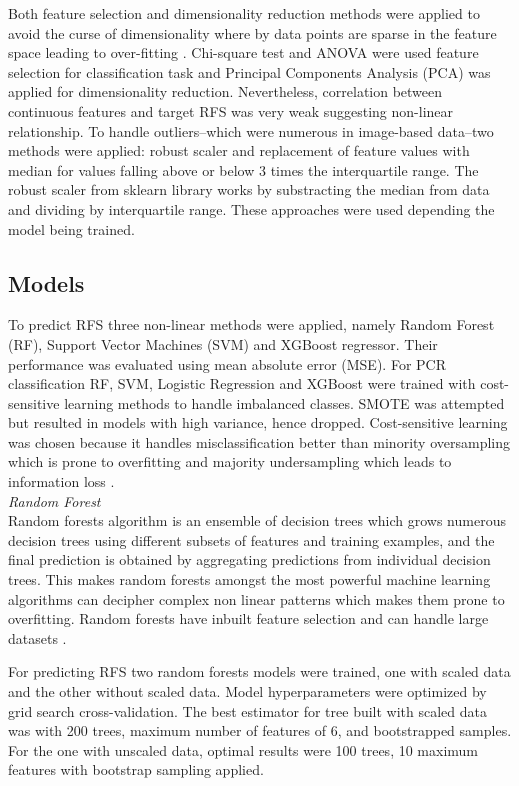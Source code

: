 \documentclass{article}
\begin{document}
Both feature selection and dimensionality reduction methods were applied to avoid the curse of dimensionality where by data points are sparse in the feature space leading to over-fitting \cite{geron2022hands}. Chi-square test and ANOVA were used feature selection for classification task and Principal Components Analysis (PCA) was applied for dimensionality reduction. Nevertheless, correlation between continuous features and target RFS was very weak suggesting non-linear relationship. 
To handle outliers--which were numerous in image-based data--two methods were applied: robust scaler and replacement of feature values with median for values falling above or below 3 times the interquartile range. The robust scaler from sklearn library works by substracting the median from data and dividing by interquartile range. These approaches were used depending the model being trained. 

\subsection{Models}
To predict RFS three non-linear methods were applied, namely Random Forest (RF), Support Vector Machines (SVM) and XGBoost regressor. Their performance was evaluated using mean absolute error (MSE). For PCR classification RF, SVM, Logistic Regression and XGBoost were trained with cost-sensitive learning methods to handle imbalanced classes. SMOTE was attempted but resulted in models with high variance, hence dropped. Cost-sensitive learning was chosen because it handles misclassification better than minority oversampling which is prone to overfitting and majority  undersampling which leads to information loss \cite{abokadr2023imbalanced}. \\

\noindent\textit{Random Forest}\\
Random forests algorithm is an ensemble of decision trees which grows numerous decision trees using different subsets of features and training examples, and the final prediction is obtained by aggregating predictions from individual decision trees. This makes random forests amongst the most powerful machine learning algorithms can decipher complex non linear patterns which makes them prone to overfitting. Random forests have inbuilt feature selection and can handle large datasets \cite{geron2022hands}. 

For predicting RFS two random forests models were trained, one with scaled data and the other without scaled data. Model hyperparameters were optimized by grid search cross-validation. The best estimator for tree built with scaled data was with 200 trees, maximum number of features of 6, and bootstrapped samples. For the one with unscaled data, optimal results were 100 trees, 10 maximum features with bootstrap sampling applied.
\end{document}
